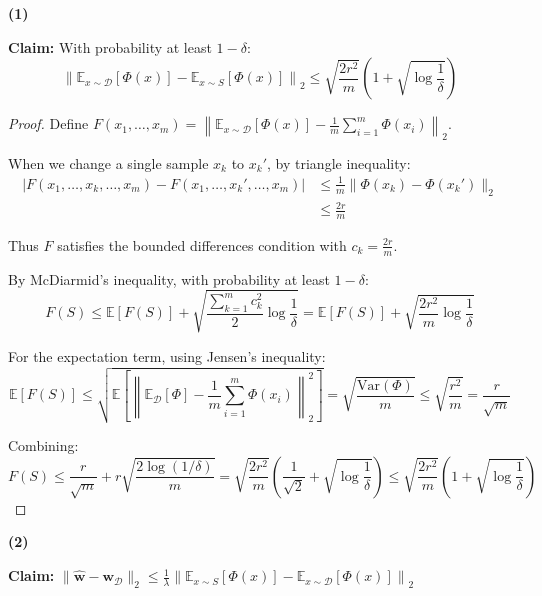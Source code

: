 \documentclass[letterpaper, 11pt]{article}
\newcommand{\1}{\mathds{1}}	%
\theoremstyle{definition}
\begin{document}
\textbf{(1)}

\textbf{Claim:} With probability at least $1-\delta$:
$$\left\| \mathbb{E}_{x \sim \mathcal{D}}[\Phi(x)] - \mathbb{E}_{x \sim S}[\Phi(x)] \right\|_2 \leq \sqrt{\frac{2r^2}{m}} \left( 1 + \sqrt{\log \frac{1}{\delta}} \right)$$

\begin{proof}
Define $F(x_1, \ldots, x_m) = \left\| \mathbb{E}_{x \sim \mathcal{D}}[\Phi(x)] - \frac{1}{m}\sum_{i=1}^{m} \Phi(x_i) \right\|_2$.

When we change a single sample $x_k$ to $x_k'$, by triangle inequality:
\begin{align*}
|F(x_1,\ldots,x_k,\ldots,x_m) - F(x_1,\ldots,x_k',\ldots,x_m)| &\leq \frac{1}{m}\|\Phi(x_k) - \Phi(x_k')\|_2 \\
&\leq \frac{2r}{m}
\end{align*}

Thus $F$ satisfies the bounded differences condition with $c_k = \frac{2r}{m}$.

By McDiarmid's inequality, with probability at least $1-\delta$:
$$F(S) \leq \mathbb{E}[F(S)] + \sqrt{\frac{\sum_{k=1}^{m} c_k^2}{2} \log\frac{1}{\delta}} = \mathbb{E}[F(S)] + \sqrt{\frac{2r^2}{m} \log\frac{1}{\delta}}$$

For the expectation term, using Jensen's inequality:
$$\mathbb{E}[F(S)] \leq \sqrt{\mathbb{E}\left[\left\|\mathbb{E}_\mathcal{D}[\Phi] - \frac{1}{m}\sum_{i=1}^m \Phi(x_i)\right\|_2^2\right]} = \sqrt{\frac{\text{Var}(\Phi)}{m}} \leq \sqrt{\frac{r^2}{m}} = \frac{r}{\sqrt{m}}$$

Combining:
$$F(S) \leq \frac{r}{\sqrt{m}} + r\sqrt{\frac{2\log(1/\delta)}{m}} = \sqrt{\frac{2r^2}{m}}\left(\frac{1}{\sqrt{2}} + \sqrt{\log\frac{1}{\delta}}\right) \leq \sqrt{\frac{2r^2}{m}}\left(1 + \sqrt{\log\frac{1}{\delta}}\right)$$
\end{proof}

\textbf{(2)}

\textbf{Claim:} $\|\widehat{\mathbf{w}} - \mathbf{w}_\mathcal{D}\|_2 \leq \frac{1}{\lambda}\left\| \mathbb{E}_{x \sim S}[\Phi(x)] - \mathbb{E}_{x \sim \mathcal{D}}[\Phi(x)] \right\|_2$
\end{document}
